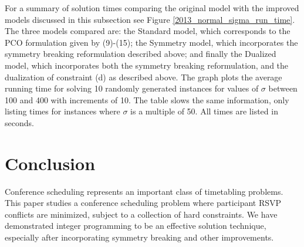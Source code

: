 \documentclass{svjour3}                     %
\begin{document}
For a summary of solution times comparing the original model with the improved models discussed in this subsection see Figure \ref{2013_normal_sigma_run_time}. 
The three models compared are: the Standard model, which corresponds to the PCO formulation given by (9)-(15); the Symmetry model, which incorporates the symmetry breaking reformulation described above; and finally the Dualized model, which incorporates both the symmetry breaking reformulation, and the dualization of constraint (d) as described above.
The graph plots the average running time for solving 10 randomly generated instances for values of $\sigma$ between 100 and 400 with increments of 10. 
The table slows the same information, only listing times for instances where $\sigma$ is a multiple of 50.
All times are listed in seconds.


\section{Conclusion}\label{sec.conclusion}
Conference scheduling represents an important class of timetabling problems.
This paper studies a conference scheduling problem where participant RSVP conflicts are minimized, subject to a collection of hard constraints.
We have demonstrated integer programming to be an effective solution technique, especially after incorporating symmetry breaking and other improvements.
	
\end{document}
